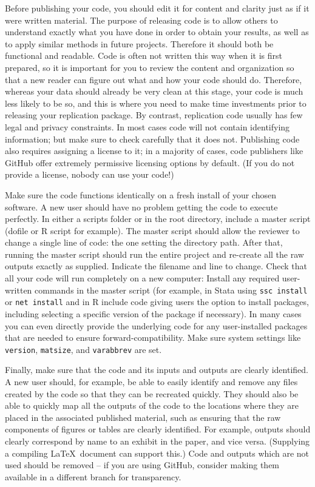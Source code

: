 Before publishing your code, you should edit it for content and clarity
just as if it were written material.
The purpose of releasing code is to allow others to understand
exactly what you have done in order to obtain your results,
as well as to apply similar methods in future projects.
Therefore it should both be functional and readable.
Code is often not written this way when it is first prepared,
so it is important for you to review the content and organization
so that a new reader can figure out what and how your code should do.
Therefore, whereas your data should already be very clean at this stage,
your code is much less likely to be so, and this is where you need to make
time investments prior to releasing your replication package.
By contrast, replication code usually has few legal and privacy constraints.
In most cases code will not contain identifying information;
but make sure to check carefully that it does not.
Publishing code also requires assigning a license to it;
in a majority of cases, code publishers like GitHub
offer extremely permissive licensing options by default.
(If you do not provide a license, nobody can use your code!)

Make sure the code functions identically on a fresh install of your chosen software.
A new user should have no problem getting the code to execute perfectly.
In either a scripts folder or in the root directory,
include a master script (dofile or R script for example).
The master script should allow the reviewer
to change a single line of code: the one setting the directory path.
After that, running the master script should run the entire project
and re-create all the raw outputs exactly as supplied.
Indicate the filename and line to change.
Check that all your code will run completely on a new computer:
Install any required user-written commands in the master script
(for example, in Stata using \texttt{ssc install} or \texttt{net install}
and in R include code giving users the option to install packages,
including selecting a specific version of the package if necessary).
In many cases you can even directly provide the underlying code
for any user-installed packages that are needed to ensure forward-compatibility.
Make sure system settings like \texttt{version}, \texttt{matsize}, and \texttt{varabbrev} are set.

Finally, make sure that the code and its inputs and outputs are clearly identified.
A new user should, for example, be able to easily identify and remove
any files created by the code so that they can be recreated quickly.
They should also be able to quickly map all the outputs of the code
to the locations where they are placed in the associated published material,
such as ensuring that the raw components of figures or tables are clearly identified.
For example, outputs should clearly correspond by name to an exhibit in the paper, and vice versa.
(Supplying a compiling \LaTeX\ document can support this.)
Code and outputs which are not used should be removed --
if you are using GitHub, consider making them available in a different branch for transparency.

